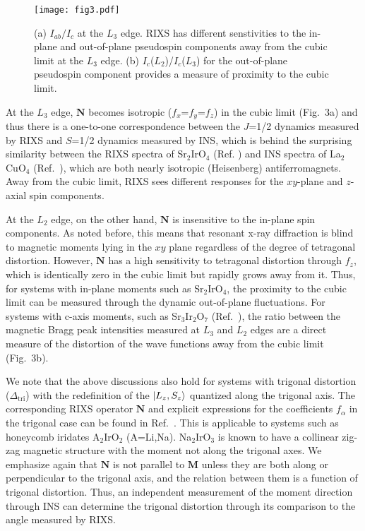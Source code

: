 \documentclass[twocolumn,prb,aps,showpacs,superscriptaddress]{revtex4-1}
\begin{document}
\begin{figure}
\centerline{\texttt{[image: fig3.pdf]}}
\caption{(a) $I_{ab}/I_c$ at the $L_3$ edge. RIXS has different senstivities
  to the in-plane and out-of-plane pseudospin components away from the cubic
  limit at the $L_3$ edge. (b) $I_c$($L_2$)/$I_c$($L_3$) for the out-of-plane
  pseudospin component provides a measure of proximity to the cubic limit. } 
\vspace{-10 pt}
\end{figure}

At the $L_3$ edge, ${\mathbf N}$ becomes isotropic ($f_x$=$f_y$=$f_z$)
in the cubic limit (Fig.~3a) and thus there is a one-to-one correspondence
between the $J$=1/2 dynamics measured by RIXS and $S$=1/2 dynamics measured by
INS, which is behind the surprising similarity between the RIXS spectra of
Sr$_2$IrO$_4$ (Ref. ) and INS spectra of La$_2$CuO$_4$
(Ref.~), which are both nearly isotropic (Heisenberg)
antiferromagnets. Away from the cubic limit, RIXS sees different responses for
the $xy$-plane and $z$-axial spin components.  

At the $L_2$ edge, on the other hand, ${\mathbf N}$ is insensitive to the
in-plane spin components. As noted before\cite{LoveseyJPhys11,MorettiPRL14},
this means that resonant x-ray diffraction is blind to magnetic moments lying
in the $xy$ plane regardless of the degree of tetragonal distortion. However,
${\mathbf N}$ has a high sensitivity to tetragonal distortion through $f_z$,
which is identically zero in the cubic limit but rapidly grows 
away from it. Thus, for systems with in-plane moments such as Sr$_2$IrO$_4$,
the proximity to the cubic limit can be measured through the dynamic
out-of-plane fluctuations. For systems with c-axis moments, such as
Sr$_3$Ir$_2$O$_7$ (Ref.~), the ratio
between the magnetic Bragg peak intensities measured at $L_3$ and $L_2$ edges
are a direct measure of the distortion of the wave functions away from the
cubic limit (Fig.~3b).  

We note that the above discussions also hold for systems with trigonal
distortion ($\Delta_{\textrm{tri}}$) with the redefinition of the 
$\ket{L_z,S_z}$ quantized along the trigonal axis. The corresponding RIXS 
operator ${\mathbf N}$ and explicit expressions for the coefficients 
$f_\alpha$ in the trigonal case can be found in Ref.~. 
This is applicable to systems such as honeycomb iridates A$_2$IrO$_2$ 
(A=Li,Na). Na$_2$IrO$_3$ is known to have a collinear zig-zag magnetic
structure\cite{ChoiPRL12} with the moment not along the trigonal 
axes\cite{Chun}. We emphasize again that ${\mathbf N}$ is not parallel to
${\mathbf M}$ unless they are both along or perpendicular to the trigonal
axis, and the relation between them is a function of trigonal 
distortion\cite{Cha16}. Thus, an independent measurement of the moment
direction through INS can determine the trigonal distortion through its
comparison to the angle measured by RIXS.   
\end{document}
